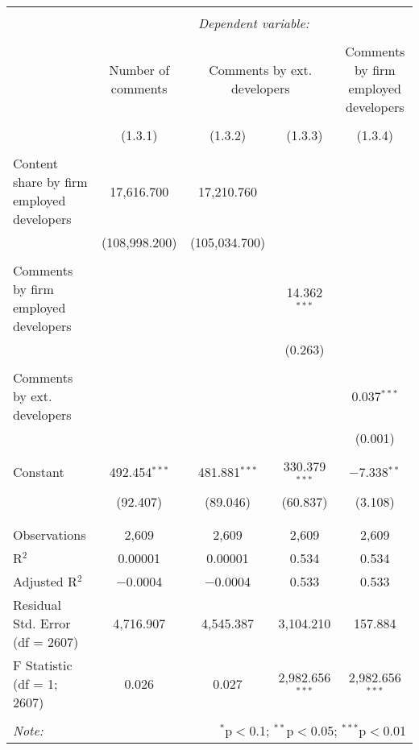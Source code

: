 
\begin{tabular}{@{\extracolsep{5pt}}lcccc}
\\[-1.8ex]\hline
\hline \\[-1.8ex]
 & \multicolumn{4}{c}{\textit{Dependent variable:}} \\
\cline{2-5}
\\[-1.8ex] & Number of comments & \multicolumn{2}{c}{Comments by ext. developers} & Comments by firm employed developers \\
\\[-1.8ex] & (1.3.1) & (1.3.2) & (1.3.3) & (1.3.4)\\
\hline \\[-1.8ex]
 Content share by firm employed developers & 17,616.700 & 17,210.760 &  &  \\
  & (108,998.200) & (105,034.700) &  &  \\
  & & & & \\
 Comments by firm employed developers &  &  & 14.362$^{***}$ &  \\
  &  &  & (0.263) &  \\
  & & & & \\
 Comments by ext. developers &  &  &  & 0.037$^{***}$ \\
  &  &  &  & (0.001) \\
  & & & & \\
 Constant & 492.454$^{***}$ & 481.881$^{***}$ & 330.379$^{***}$ & $-$7.338$^{**}$ \\
  & (92.407) & (89.046) & (60.837) & (3.108) \\
  & & & & \\
\hline \\[-1.8ex]
Observations & 2,609 & 2,609 & 2,609 & 2,609 \\
R$^{2}$ & 0.00001 & 0.00001 & 0.534 & 0.534 \\
Adjusted R$^{2}$ & $-$0.0004 & $-$0.0004 & 0.533 & 0.533 \\
Residual Std. Error (df = 2607) & 4,716.907 & 4,545.387 & 3,104.210 & 157.884 \\
F Statistic (df = 1; 2607) & 0.026 & 0.027 & 2,982.656$^{***}$ & 2,982.656$^{***}$ \\
\hline
\hline \\[-1.8ex]
\textit{Note:}  & \multicolumn{4}{r}{$^{*}$p$<$0.1; $^{**}$p$<$0.05; $^{***}$p$<$0.01} \\
\end{tabular}
